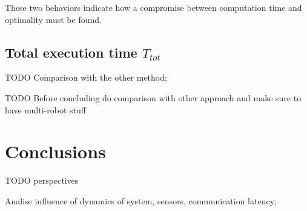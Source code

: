 \documentclass[eprint]{actapoly}
\begin{document}
These two behaviors indicate how a compromise between computation time and optimality must be found.



\subsection{Total execution time $T_{tot}$}





TODO Comparison with the other method;

TODO Before concluding do comparison with other approach and make sure to have 
multi-robot stuff

\section{Conclusions}




TODO perspectives

Analise influence of dynamics of system, sensors, communication latency;

\newpage
\mbox{}\newpage



\end{document}

